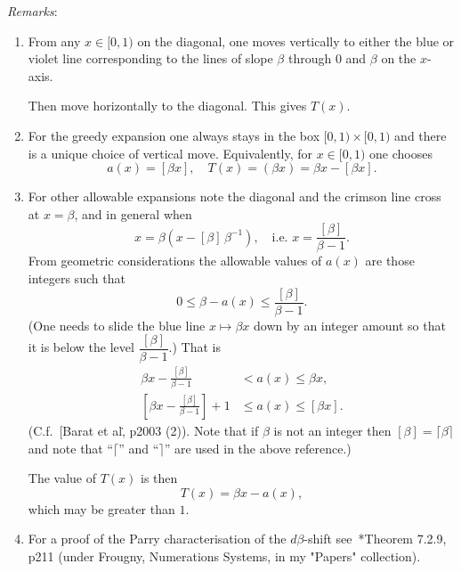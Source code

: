 \documentclass[a4paper]{amsart}
\theoremstyle{plain}
\theoremstyle{definition}
\theoremstyle{remark}
\begin{document}
\newpage
\noindent \emph{Remarks}:
\begin{enumerate}
 \item From any $ x  \in [0,1)$ on the diagonal, one moves vertically to either the blue or violet line corresponding to the lines of slope $ \beta $ through $ 0 $ and $ \beta$ on the $ x $-axis.

Then move horizontally to the diagonal.   This gives $  T(x) $.  

\item For the greedy expansion one always stays in the  box $  [0,1)\times [0,1) $ and there is a unique choice of vertical move.  Equivalently, for $ x \in [0,1) $ one chooses
\[
 a(x)  = [\beta x ] , \quad T(x) = (\beta x ) = \beta x -  [\beta x ] .
 \]

\item For other allowable expansions note   the diagonal and  the crimson line cross at $ x= \beta $, and in general when
\[ 
x = \beta \left( x - [\beta ]\, \beta ^{-1} \right),\quad   \text{i.e.\ } x = \frac {[\beta ]}{\beta -1 }.
\]
 From geometric considerations the allowable values of $ a(x) $ are those integers such that
\[
0 \leq \beta - a(x) \leq \frac {[\beta ]}{\beta -1 }.
\]
(One needs to slide the blue line $ x \mapsto \beta x $ down by an integer amount so that it is   below the level $\dfrac {[\beta ]}{\beta -1 }$.)
That is
\begin{align*}
\beta x -\frac {[\beta ]}{\beta -1 } &< a(x) \leq \beta x ,\\
\left[\beta x -\frac {[\beta ]}{\beta -1 }\right] + 1  &\leq  a(x) \leq [\beta x] .
\end{align*} 
 (C.f.\ [Barat et al\., p2003 (2)).  Note that if $ \beta $ is not an integer then $ [ \beta ] = \lceil \beta \rceil $ 
and note that ``$ \lceil $'' and ``$ \rceil $'' are used in the above reference.)

The value of $ T(x) $ is then 
\[ T(x) =  \beta x - a(x) ,
\]
which may be greater than $ 1 $.

\item For a proof of the Parry characterisation of the $ d\beta$-shift see~\cite{Fro}*{Theorem 7.2.9, p211}  (under Frougny, Numerations Systems, in my "Papers" collection). 
 
\end{enumerate} 
\end{document}
